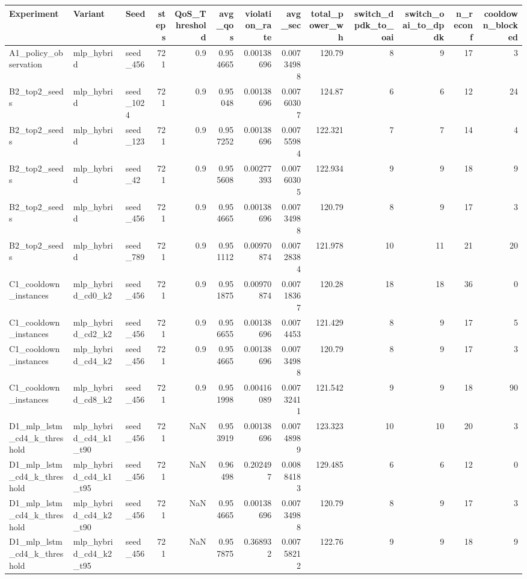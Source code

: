 \begin{tabular}{lllrrrrrrrrrr}
\toprule
Experiment & Variant & Seed & steps & QoS_Threshold & avg_qos & violation_rate & avg_sec & total_power_wh & switch_dpdk_to_oai & switch_oai_to_dpdk & n_reconf & cooldown_blocked \\
\midrule
A1_policy_observation & mlp_hybrid & seed_456 & 721 & 0.9 & 0.954665 & 0.00138696 & 0.00734988 & 120.79 & 8 & 9 & 17 & 3 \\
B2_top2_seeds & mlp_hybrid & seed_1024 & 721 & 0.9 & 0.95048 & 0.00138696 & 0.00760307 & 124.87 & 6 & 6 & 12 & 24 \\
B2_top2_seeds & mlp_hybrid & seed_123 & 721 & 0.9 & 0.957252 & 0.00138696 & 0.00755984 & 122.321 & 7 & 7 & 14 & 4 \\
B2_top2_seeds & mlp_hybrid & seed_42 & 721 & 0.9 & 0.955608 & 0.00277393 & 0.00760305 & 122.934 & 9 & 9 & 18 & 9 \\
B2_top2_seeds & mlp_hybrid & seed_456 & 721 & 0.9 & 0.954665 & 0.00138696 & 0.00734988 & 120.79 & 8 & 9 & 17 & 3 \\
B2_top2_seeds & mlp_hybrid & seed_789 & 721 & 0.9 & 0.951112 & 0.00970874 & 0.00728384 & 121.978 & 10 & 11 & 21 & 20 \\
C1_cooldown_instances & mlp_hybrid_cd0_k2 & seed_456 & 721 & 0.9 & 0.951875 & 0.00970874 & 0.00718367 & 120.28 & 18 & 18 & 36 & 0 \\
C1_cooldown_instances & mlp_hybrid_cd2_k2 & seed_456 & 721 & 0.9 & 0.956655 & 0.00138696 & 0.0074453 & 121.429 & 8 & 9 & 17 & 5 \\
C1_cooldown_instances & mlp_hybrid_cd4_k2 & seed_456 & 721 & 0.9 & 0.954665 & 0.00138696 & 0.00734988 & 120.79 & 8 & 9 & 17 & 3 \\
C1_cooldown_instances & mlp_hybrid_cd8_k2 & seed_456 & 721 & 0.9 & 0.951998 & 0.00416089 & 0.00732411 & 121.542 & 9 & 9 & 18 & 90 \\
D1_mlp_lstm_cd4_k_threshold & mlp_hybrid_cd4_k1_t90 & seed_456 & 721 & NaN & 0.953919 & 0.00138696 & 0.00748989 & 123.323 & 10 & 10 & 20 & 3 \\
D1_mlp_lstm_cd4_k_threshold & mlp_hybrid_cd4_k1_t95 & seed_456 & 721 & NaN & 0.96498 & 0.202497 & 0.00884183 & 129.485 & 6 & 6 & 12 & 0 \\
D1_mlp_lstm_cd4_k_threshold & mlp_hybrid_cd4_k2_t90 & seed_456 & 721 & NaN & 0.954665 & 0.00138696 & 0.00734988 & 120.79 & 8 & 9 & 17 & 3 \\
D1_mlp_lstm_cd4_k_threshold & mlp_hybrid_cd4_k2_t95 & seed_456 & 721 & NaN & 0.957875 & 0.368932 & 0.00758212 & 122.76 & 9 & 9 & 18 & 9 \\
\bottomrule
\end{tabular}
